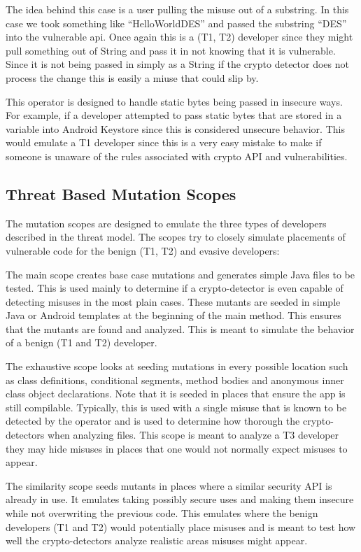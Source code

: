  The idea behind this case is a user pulling the misuse out of a substring. In this case we took something like “HelloWorldDES” and passed the substring “DES” into the vulnerable api. Once again this is a (T1, T2) developer since they might pull something out of String and pass it in not knowing that it is vulnerable. Since it is not being passed in simply as a String if the crypto detector does not process the change this is easily a miuse that could slip by.

 This operator is designed to handle static bytes being passed in insecure ways. For example, if a developer attempted to pass static bytes that are stored in a variable into Android Keystore since this is considered unsecure behavior. This would emulate a T1 developer since this is a very easy mistake to make if someone is unaware of the rules associated with crypto API and vulnerabilities.



\subsection{Threat Based Mutation Scopes}
\label{ch2:sec:scopes}

The mutation scopes are designed to emulate the three types of developers described in the threat model. The scopes try to closely simulate placements of vulnerable code for the benign (T1, T2) and evasive developers:

The main scope creates base case mutations and generates simple Java files to be tested. This is used mainly to determine if a crypto-detector is even capable of detecting misuses in the most plain cases. These mutants are seeded in simple Java or Android templates at the beginning of the main method. This ensures that the mutants are found and analyzed. This is meant to simulate the behavior of a benign (T1 and T2) developer.

The exhaustive scope looks at seeding mutations in every possible location such as class definitions, conditional segments, method bodies and anonymous inner class object declarations. Note that it is seeded in places that ensure the app is still compilable. Typically, this is used with a single misuse that is known to be detected by the operator and is used to determine how thorough the crypto-detectors when analyzing files. This scope is meant to analyze a T3 developer they may hide misuses in places that one would not normally expect misuses to appear.

The similarity scope seeds mutants in places where a similar security API is already in use. It emulates taking possibly secure uses and making them insecure while not overwriting the previous code. This emulates where the benign developers (T1 and T2) would potentially place misuses and is meant to test how well the crypto-detectors analyze realistic areas misuses might appear. 
